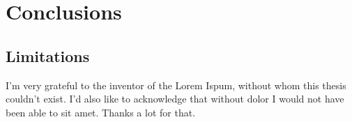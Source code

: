 \documentclass[a4paper,singleside,12pt]{report} %
\begin{document}
\section{Conclusions}\label{conclusions}


  \subsection{Limitations}\label{limitations}

	\appendix
	
	\printbibliography[heading=bibintoc] %
	
	\acknowledgements
	   I'm very grateful to the inventor of the Lorem Ispum, without whom this thesis couldn't exist. I'd also like to acknowledge that without dolor I would not have been able to sit amet. Thanks a lot for that.
		
\end{document}
